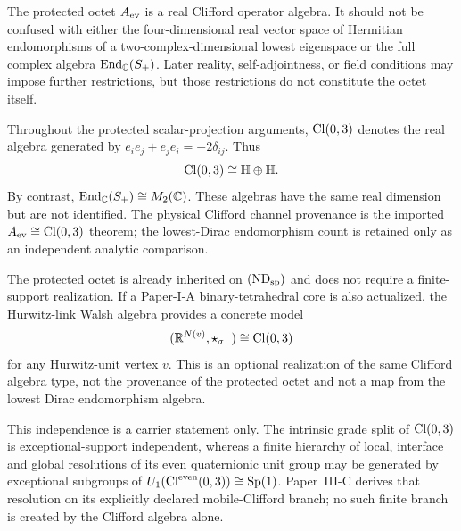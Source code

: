 \documentclass[12pt,a4paper]{article}
\begin{document}
\begin{remark}
The protected octet \(A_{\rm ev}\) is a real Clifford operator algebra.  It
should not be confused with either the four-dimensional real vector space of
Hermitian endomorphisms of a two-complex-dimensional lowest eigenspace or the
full complex algebra \(\operatorname{End}_{\mathbb C}(S_+)\).  Later reality,
self-adjointness, or field conditions may impose further restrictions, but
those restrictions do not constitute the octet itself.
\end{remark}

\begin{remark}
\label{p3:rem:clifford-sign-operator-realization}
Throughout the protected scalar-projection arguments,
\(\operatorname{Cl}(0,3)\) denotes the real algebra generated by
\(e_ie_j+e_je_i=-2\delta_{ij}\).  Thus
\[
 \operatorname{Cl}(0,3)\cong\mathbb H\oplus\mathbb H.
\]
By contrast, \(\operatorname{End}_{\mathbb C}(S_+)\cong M_2(\mathbb C)\).  These algebras
have the same real dimension but are not identified.  The physical Clifford
channel provenance is the imported \(A_{\rm ev}\cong\operatorname{Cl}(0,3)\) theorem;
the lowest-Dirac endomorphism count is retained only as an independent
analytic comparison.
\end{remark}

\begin{remark}
\label{p3:rem:hurwitz-link-origin-octet}
The protected octet is already inherited on \((\mathrm{ND}_{\rm sp})\)
and does not require a finite-support realization.  If a Paper-I-A
binary-tetrahedral core is also actualized, the Hurwitz-link Walsh algebra
provides a concrete model
\[
 (\mathbb R^{N(v)},\star_{\sigma_-})\cong\operatorname{Cl}(0,3)
\]
for any Hurwitz-unit vertex \(v\).  This is an optional realization of the
same Clifford algebra type, not the provenance of the protected octet and not
a map from the lowest Dirac endomorphism algebra.

This independence is a carrier statement only.  The intrinsic grade split of
\(\operatorname{Cl}(0,3)\) is exceptional-support independent, whereas a finite hierarchy
of local, interface and global resolutions of its even quaternionic unit
group may be generated by exceptional subgroups of
\(U_1(\operatorname{Cl}^{\rm even}(0,3))\cong\operatorname{Sp}(1)\).  Paper~III-C derives that resolution
on its explicitly declared mobile-Clifford branch; no such finite branch is
created by the Clifford algebra alone.
\end{remark}
\end{document}
